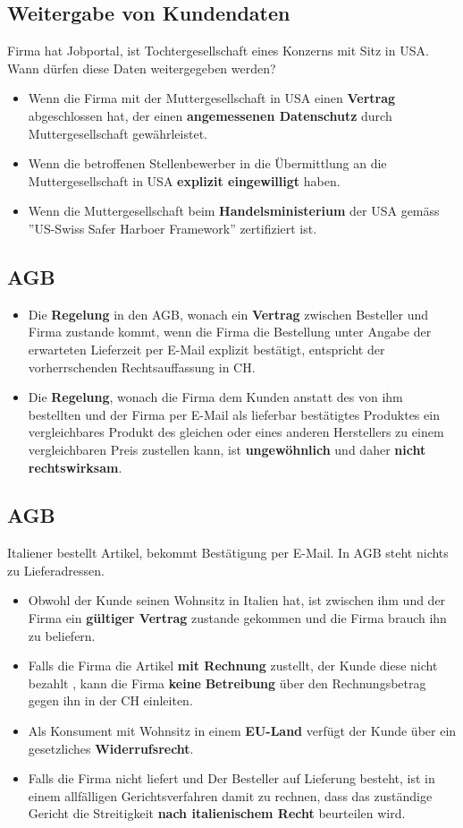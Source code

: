 \subsection{Weitergabe von Kundendaten}
Firma hat Jobportal, ist Tochtergesellschaft eines Konzerns mit Sitz in USA. Wann dürfen diese Daten weitergegeben werden?
\begin{itemize}
	\item Wenn die Firma mit der Muttergesellschaft in USA einen \textbf{Vertrag} abgeschlossen hat, der einen \textbf{angemessenen Datenschutz} durch Muttergesellschaft gewährleistet.
	\item Wenn die betroffenen Stellenbewerber in die Übermittlung an die Muttergesellschaft in USA \textbf{explizit eingewilligt} haben.
	\item Wenn die Muttergesellschaft beim \textbf{Handelsministerium} der USA gemäss ''US-Swiss Safer Harboer Framework'' zertifiziert ist.
\end{itemize}

\subsection{AGB}
\begin{itemize}
	\item Die \textbf{Regelung} in den AGB, wonach ein \textbf{Vertrag} zwischen Besteller und Firma zustande kommt, wenn die Firma die Bestellung unter Angabe der erwarteten Lieferzeit per E-Mail explizit bestätigt, entspricht der vorherrschenden Rechtsauffassung in CH.
	\item Die \textbf{Regelung}, wonach die Firma dem Kunden anstatt des von ihm bestellten und der Firma per E-Mail als lieferbar bestätigtes Produktes ein vergleichbares Produkt des gleichen oder eines anderen Herstellers zu einem vergleichbaren Preis zustellen kann, ist \textbf{ungewöhnlich} und daher \textbf{nicht rechtswirksam}.
\end{itemize}

\subsection{AGB}
Italiener bestellt Artikel, bekommt Bestätigung per E-Mail. In AGB steht nichts zu Lieferadressen.
\begin{itemize}
	\item Obwohl der Kunde seinen Wohnsitz in Italien hat, ist zwischen ihm und der Firma ein \textbf{gültiger Vertrag} zustande gekommen und die Firma brauch ihn zu beliefern.
	\item Falls die Firma die Artikel \textbf{mit Rechnung} zustellt, der Kunde diese nicht bezahlt	, kann die Firma \textbf{keine} \textbf{Betreibung} über den Rechnungsbetrag gegen ihn in der CH einleiten.
	\item Als Konsument mit Wohnsitz in einem \textbf{EU-Land} verfügt der Kunde über ein gesetzliches \textbf{Widerrufsrecht}.
	\item Falls die Firma nicht liefert und Der Besteller auf Lieferung besteht, ist in einem allfälligen Gerichtsverfahren damit zu rechnen, dass das zuständige Gericht die Streitigkeit \textbf{nach italienischem Recht} beurteilen wird.
\end{itemize}

